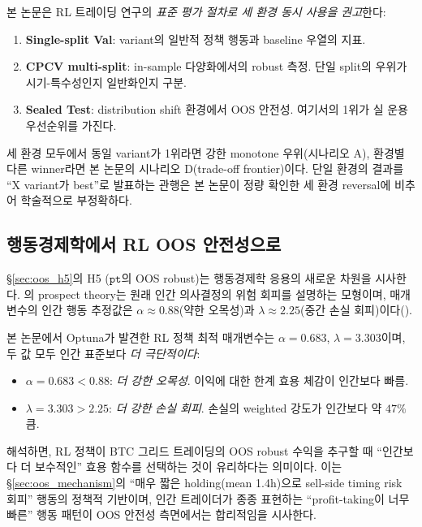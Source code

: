 \documentclass[11pt, a4paper]{article}
\begin{document}
본 논문은 RL 트레이딩 연구의 \emph{표준 평가 절차로 세 환경 동시 사용을 권고}한다:

\begin{enumerate}[leftmargin=*]
\item \textbf{Single-split Val}: variant의 일반적 정책 행동과 baseline 우열의
지표.
\item \textbf{CPCV multi-split}: in-sample 다양화에서의 robust 측정. 단일 split의
우위가 시기-특수성인지 일반화인지 구분.
\item \textbf{Sealed Test}: distribution shift 환경에서 OOS 안전성. 여기서의
1위가 실 운용 우선순위를 가진다.
\end{enumerate}

세 환경 모두에서 동일 variant가 1위라면 강한 monotone 우위(시나리오 A),
환경별 다른 winner라면 본 논문의 시나리오 D(trade-off frontier)이다. 단일
환경의 결과를 ``X variant가 best''로 발표하는 관행은 본 논문이 정량 확인한
세 환경 reversal에 비추어 학술적으로 부정확하다.

\subsection{행동경제학에서 RL OOS 안전성으로}
\label{sec:disc_pt_safety}

\S\ref{sec:oos_h5}의 H5 ($\texttt{pt}$의 OOS robust)는 행동경제학 응용의
새로운 차원을 시사한다. \citet{kahneman1979prospect}의 prospect theory는
원래 인간 의사결정의 위험 회피를 설명하는 모형이며, 매개변수의 인간 행동
추정값은 $\alpha \approx 0.88$(약한 오목성)과 $\lambda \approx 2.25$(중간 손실
회피)이다(\citealt{tversky1992cumulative}).

본 논문에서 Optuna가 발견한 RL 정책 최적 매개변수는 $\alpha = 0.683$,
$\lambda = 3.303$이며, 두 값 모두 인간 표준보다 \emph{더 극단적이다}:
\begin{itemize}[leftmargin=*]
\item $\alpha = 0.683 < 0.88$: \emph{더 강한 오목성}. 이익에 대한 한계 효용
체감이 인간보다 빠름.
\item $\lambda = 3.303 > 2.25$: \emph{더 강한 손실 회피}. 손실의 weighted
강도가 인간보다 약 $47\%$ 큼.
\end{itemize}

해석하면, RL 정책이 BTC 그리드 트레이딩의 OOS robust 수익을 추구할 때 ``인간보다
더 보수적인'' 효용 함수를 선택하는 것이 유리하다는 의미이다. 이는 \S\ref{sec:oos_mechanism}의
``매우 짧은 holding(mean 1.4h)으로 sell-side timing risk 회피'' 행동의 정책적
기반이며, 인간 트레이더가 종종 표현하는 ``profit-taking이 너무 빠른'' 행동
패턴이 OOS 안전성 측면에서는 합리적임을 시사한다.
\end{document}
